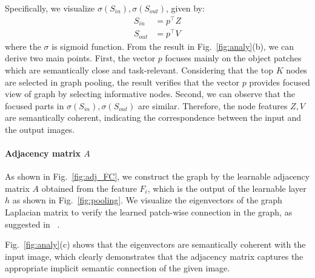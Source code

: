 \documentclass[letterpaper]{article} %
\begin{document}
Specifically, we visualize $\sigma(S_{in}), \sigma(S_{out})$, given by:
\begin{align}
	S_{in} &= p^\top Z \\
	S_{out} &= p^\top V
\end{align}
where the $\sigma$ is sigmoid function.
From the result in Fig.~\ref{fig:analy}(b), we can derive two main points. 
First, the vector $p$ focuses mainly on the object patches which are semantically close and task-relevant. 
Considering that the top $K$ nodes are selected in graph pooling, the result verifies that the vector $p$ provides focused view of graph by selecting informative nodes.
Second, we can observe that the focused parts in $\sigma(S_{in}), \sigma(S_{out})$ are similar. Therefore, the node features $Z, V$ are semantically coherent, indicating the correspondence between the input and the output images. 




\paragraph{Adjacency matrix $A$}
As shown in Fig.~\ref{fig:adj_FC}, 
we construct the graph by the learnable adjacency matrix $A$ obtained from the feature $F_i$, which is the output of the learnable layer $h$ as shown in Fig.~\ref{fig:pooling}. We visualize the eigenvectors of the graph Laplacian matrix to verify the learned patch-wise connection in the graph, as suggested in ~\cite{deepSpectral}. 

Fig.~\ref{fig:analy}(c) shows that the eigenvectors are semantically coherent with the input image, which clearly demonstrates that the adjacency matrix captures the appropriate implicit semantic connection of the given image. 
\end{document}
